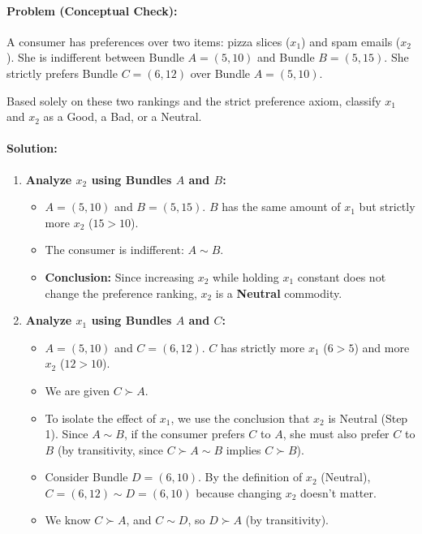 \documentclass{article}
\begin{document}
\paragraph*{Problem (Conceptual Check):}
A consumer has preferences over two items: pizza slices ($x_1$) and spam emails ($x_2$). She is indifferent between Bundle $A=(5, 10)$ and Bundle $B=(5, 15)$. She strictly prefers Bundle $C=(6, 12)$ over Bundle $A=(5, 10)$.

Based solely on these two rankings and the strict preference axiom, classify $x_1$ and $x_2$ as a Good, a Bad, or a Neutral.

\paragraph*{Solution:}
\begin{enumerate}
    \item \textbf{Analyze $x_2$ using Bundles $A$ and $B$:}
    \begin{itemize}
        \item[\circ] $A = (5, 10)$ and $B = (5, 15)$. $B$ has the same amount of $x_1$ but strictly more $x_2$ ($15 > 10$).
        \item[\circ] The consumer is indifferent: $A \sim B$.
        \item[\circ] \textbf{Conclusion:} Since increasing $x_2$ while holding $x_1$ constant does not change the preference ranking, $x_2$ is a \textbf{Neutral} commodity.
    \end{itemize}
    \item \textbf{Analyze $x_1$ using Bundles $A$ and $C$:}
    \begin{itemize}
        \item[\circ] $A = (5, 10)$ and $C = (6, 12)$. $C$ has strictly more $x_1$ ($6 > 5$) and more $x_2$ ($12 > 10$).
        \item[\circ] We are given $C \succ A$.
        \item[\circ] To isolate the effect of $x_1$, we use the conclusion that $x_2$ is Neutral (Step 1). Since $A \sim B$, if the consumer prefers $C$ to $A$, she must also prefer $C$ to $B$ (by transitivity, since $C \succ A \sim B$ implies $C \succ B$).
        \item[\circ] Consider Bundle $D = (6, 10)$. By the definition of $x_2$ (Neutral), $C = (6, 12) \sim D = (6, 10)$ because changing $x_2$ doesn't matter.
        \item[\circ] We know $C \succ A$, and $C \sim D$, so $D \succ A$ (by transitivity).

\end{itemize}
\end{enumerate}
\end{document}

